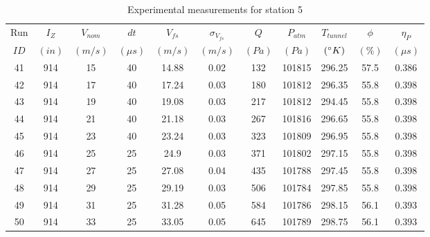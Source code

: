 \begin{table}[H]
\begin{center}
\begin{tabular}{|ccccccccccc|}
	\hline
	Run & $I_Z$ & $V_{nom}$ & $dt$ & $V_{fs}$ & $\sigma_{V_{fs}}$ & $Q$ & $P_{atm}$ & $T_{tunnel}$ & $\phi$ & $\eta_P$\\
	$ID$ & $(in)$ & $(m/s)$ & $(\mu s)$ & $(m/s)$ & $(m/s)$ & $(Pa)$ & $(Pa)$ & $(\degree K)$ & $(\%)$ & $(\mu s)$\\
	\hline
	41 & 914 & 15 & 40 & 14.88 & 0.02 & 132 & 101815 & 296.25 & 57.5 & 0.386\\
	42 & 914 & 17 & 40 & 17.24 & 0.03 & 180 & 101812 & 296.35 & 55.8 & 0.398\\
	43 & 914 & 19 & 40 & 19.08 & 0.03 & 217 & 101812 & 294.45 & 55.8 & 0.398\\
	44 & 914 & 21 & 40 & 21.18 & 0.03 & 267 & 101816 & 296.65 & 55.8 & 0.398\\
	45 & 914 & 23 & 40 & 23.24 & 0.03 & 323 & 101809 & 296.95 & 55.8 & 0.398\\
	46 & 914 & 25 & 25 & 24.9 & 0.03 & 371 & 101802 & 297.15 & 55.8 & 0.398\\
	47 & 914 & 27 & 25 & 27.08 & 0.04 & 435 & 101788 & 297.45 & 55.8 & 0.398\\
	48 & 914 & 29 & 25 & 29.19 & 0.03 & 506 & 101784 & 297.85 & 55.8 & 0.398\\
	49 & 914 & 31 & 25 & 31.28 & 0.05 & 584 & 101786 & 298.15 & 56.1 & 0.393\\
	50 & 914 & 33 & 25 & 33.05 & 0.05 & 645 & 101789 & 298.75 & 56.1 & 0.393\\
	\hline
\end{tabular}
\caption{Experimental measurements for station 5}
\label{table:station_5_measurements}
\end{center}
\end{table}

